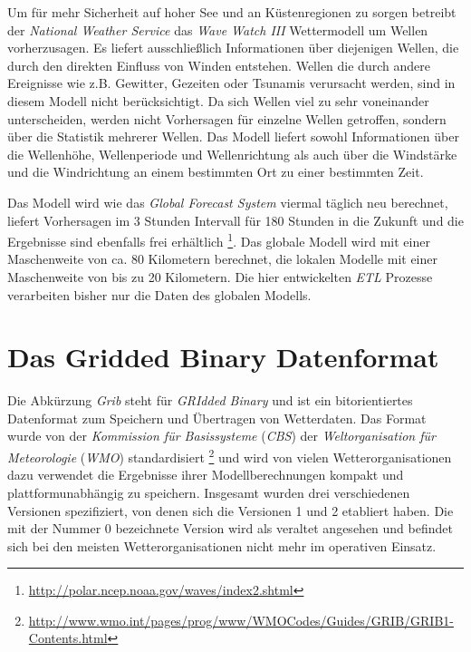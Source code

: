 Um für mehr Sicherheit auf hoher See und an Küstenregionen zu sorgen
betreibt der \textit{National Weather Service} das \textit{Wave Watch
  III} Wettermodell um Wellen vorherzusagen. Es liefert ausschließlich
Informationen über diejenigen Wellen, die durch den direkten Einfluss
von Winden entstehen. Wellen die durch andere Ereignisse wie
z.B. Gewitter, Gezeiten oder Tsunamis verursacht werden, sind in
diesem Modell nicht berücksichtigt. Da sich Wellen viel zu sehr
voneinander unterscheiden, werden nicht Vorhersagen für einzelne
Wellen getroffen, sondern über die Statistik mehrerer Wellen. Das
Modell liefert sowohl Informationen über die Wellenhöhe, Wellenperiode
und Wellenrichtung als auch über die Windstärke und die Windrichtung
an einem bestimmten Ort zu einer bestimmten Zeit.

Das Modell wird wie das \textit{Global Forecast System} viermal
täglich neu berechnet, liefert Vorhersagen im 3 Stunden Intervall für
180 Stunden in die Zukunft und die Ergebnisse sind ebenfalls frei
erhältlich
\footnote{\url{http://polar.ncep.noaa.gov/waves/index2.shtml}}. Das
globale Modell wird mit einer Maschenweite von ca. 80 Kilometern
berechnet, die lokalen Modelle mit einer Maschenweite von bis zu 20
Kilometern. Die hier entwickelten \textit{ETL} Prozesse verarbeiten
bisher nur die Daten des globalen Modells.

\section{Das Gridded Binary Datenformat}

Die Abkürzung \textit{Grib}  steht
für \textit{GRIdded Binary} und ist ein bitorientiertes Datenformat
zum Speichern und Übertragen von Wetterdaten. Das Format wurde von der
\textit{Kommission für Basissysteme} (\textit{CBS})
 der
\textit{Weltorganisation für Meteorologie} (\textit{WMO})
 standardisiert
\footnote{\url{http://www.wmo.int/pages/prog/www/WMOCodes/Guides/GRIB/GRIB1-Contents.html}}
und wird von vielen Wetterorganisationen dazu verwendet die Ergebnisse
ihrer Modellberechnungen kompakt und plattformunabhängig zu
speichern. Insgesamt wurden drei verschiedenen Versionen spezifiziert,
von denen sich die Versionen 1 und 2 etabliert haben. Die mit der
Nummer 0 bezeichnete Version wird als veraltet angesehen und befindet
sich bei den meisten Wetterorganisationen nicht mehr im operativen
Einsatz.

